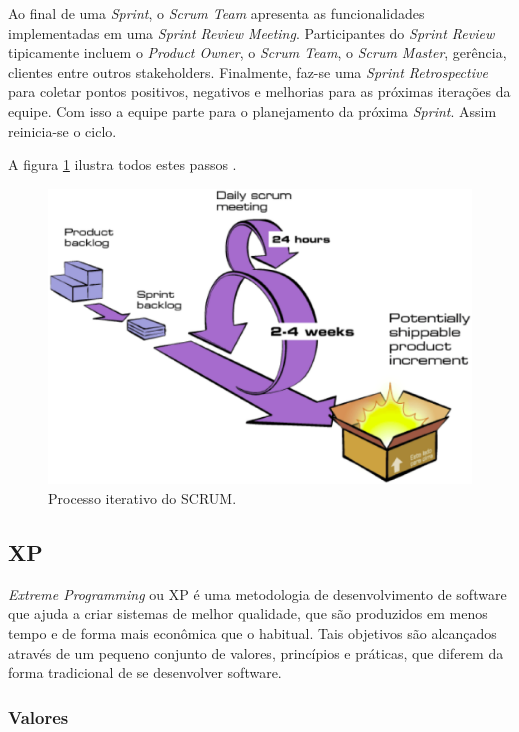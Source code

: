 Ao final de uma \textit{Sprint}, o \textit{Scrum Team} apresenta as funcionalidades implementadas em uma \textit{Sprint Review Meeting}.  Participantes do \textit{Sprint Review} tipicamente incluem o \textit{Product Owner}, o \textit{Scrum Team}, o \textit{Scrum Master}, gerência, clientes entre outros stakeholders. Finalmente, faz-se uma \textit{Sprint Retrospective} para coletar pontos positivos, negativos e melhorias para as próximas iterações da equipe. Com isso a equipe parte para o planejamento da próxima \textit{Sprint}. Assim reinicia-se o ciclo. \cite{scrum}

A figura \ref{fig:scrum} ilustra todos estes passos \cite{scrum}.

\begin{figure}[h!]
	\centering
  \includegraphics[keepaspectratio=true,scale=0.5]{figuras/scrum.eps}
  \caption{Processo iterativo do SCRUM.}
	\label{fig:scrum}
\end{figure}

\subsection{XP}

\textit{Extreme Programming} ou XP é uma metodologia de desenvolvimento de software que ajuda a criar sistemas de melhor qualidade, que são produzidos em menos tempo e de forma mais econômica que o habitual. Tais objetivos são alcançados através de um pequeno conjunto de valores, princípios e práticas, que diferem da forma tradicional de se desenvolver software. \cite{xp}

\subsubsection{Valores}

